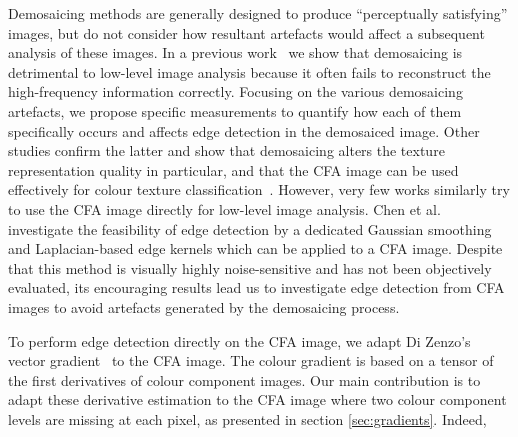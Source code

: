\documentclass[twoside]{article}
\begin{document}

Demosaicing methods are generally designed to produce ``perceptually satisfying'' images, but do not consider how resultant artefacts would affect a subsequent analysis of these images. In a previous work~\cite{losson_aiep_2010} we show that demosaicing is detrimental to low-level image analysis because it often fails to reconstruct the high-frequency information correctly. Focusing on the various demosaicing artefacts, we propose specific measurements to quantify how each of them specifically occurs and affects edge detection in the demosaiced image. Other studies confirm the latter and show that demosaicing alters the texture representation quality in particular, and that the CFA image can be used effectively for colour texture classification~\cite{losson_ietip_2012, losson_cviu_2013}. However, very few works similarly try to use the CFA image directly for low-level image analysis. Chen et al.~\cite{chen_apccas_2006} investigate the feasibility of edge detection by a dedicated Gaussian smoothing and Laplacian-based edge kernels which can be applied to a CFA image. Despite that this method is visually highly noise-sensitive and has not been objectively evaluated, its encouraging results lead us to investigate edge detection from CFA images to avoid artefacts generated by the demosaicing process. 

To perform edge detection directly on the CFA image, we adapt Di Zenzo's vector gradient~\cite{zenzo_cvgip_1986} to the CFA image. The colour gradient is based on a tensor of the first derivatives of colour component images. Our main contribution is to adapt these derivative estimation to the CFA image where two colour component levels are missing at each pixel, as presented in section \ref{sec:gradients}. Indeed, 
\end{document}
